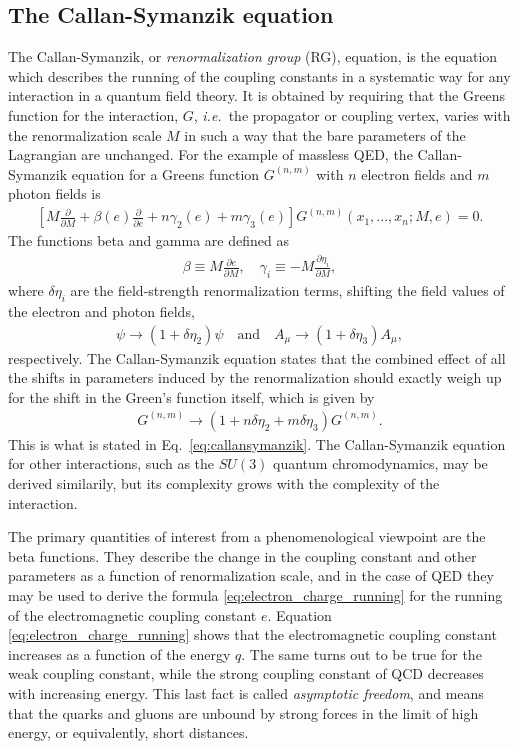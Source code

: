 \documentclass[twoside,english]{uiofysmaster}
\begin{document}
\subsection{The Callan-Symanzik equation}
The Callan-Symanzik, or {\it renormalization group} (RG), equation, is the equation which describes the running of the coupling constants in a systematic way for any interaction in a quantum field theory. It is obtained by requiring that the Greens function for the interaction, $G$, {\it i.e.}\ the propagator or coupling vertex, varies with the renormalization scale $M$ in such a way that the bare parameters of the Lagrangian are unchanged. For the example of massless QED, the Callan-Symanzik equation for a Greens function $G^{(n,m)}$ with $n$ electron fields and $m$ photon fields is \cite{Peskin-Schroeder}
\begin{align}
	\left[ M \frac{\partial}{\partial M} + \beta(e) \frac{\partial}{\partial e} + n\gamma_2(e) + m\gamma_3(e)\right] G^{(n,m)}(x_1, ..., x_n; M,e) = 0.\label{eq:callansymanzik}
\end{align}
The functions beta and gamma are defined as
\begin{align}
	\beta \equiv M\frac{\partial e}{\partial M} , \quad \gamma_i \equiv - M\frac{\partial \eta_i}{\partial M},
\end{align}
where $\delta\eta_i$ are the field-strength renormalization terms, shifting the field values of the electron and photon fields,
\begin{align}
	\psi \to (1 + \delta \eta_2) \psi \quad \mathrm{and} \quad A_\mu \to (1 + \delta\eta_3) A_\mu,
\end{align}
respectively. The Callan-Symanzik equation states that the combined effect of all the shifts in parameters induced by the renormalization should exactly weigh up for the shift in the Green's function itself, which is given by
\begin{align}
	G^{(n,m)} \to (1 + n\delta\eta_2 + m\delta\eta_3)G^{(n,m)}.
\end{align}
This is what is stated in Eq.\ \eqref{eq:callansymanzik}. The Callan-Symanzik equation for other interactions, such as the $SU(3)$ quantum chromodynamics, may be derived similarily, but its complexity grows with the complexity of the interaction.

The primary quantities of interest from a phenomenological viewpoint are the beta functions. They describe the change in the coupling constant and other parameters as a function of renormalization scale, and in the case of QED they may be used to derive the formula \eqref{eq:electron_charge_running} for the running of the electromagnetic coupling constant $e$. Equation \eqref{eq:electron_charge_running} shows that the electromagnetic coupling constant increases as a function of the energy $q$. The same turns out to be true for the weak coupling constant, while the strong coupling constant of QCD decreases with increasing energy. This last fact is called {\it asymptotic freedom}, and means that the quarks and gluons are unbound by strong forces in the limit of high energy, or equivalently, short distances. 
\end{document}

